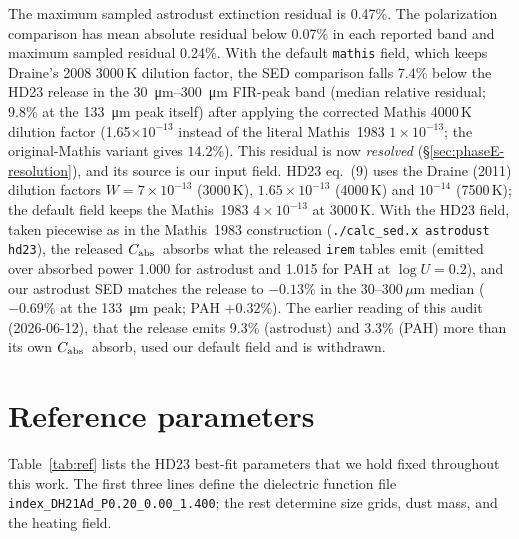 \documentclass{my_memo}
\newcommand{\Cabs}{\ensuremath{C_{\rm abs}}}
\begin{document}
The maximum sampled astrodust extinction residual is 0.47\%. The
polarization comparison has mean absolute residual below 0.07\% in
each reported band and maximum sampled residual 0.24\%. With the default
\texttt{mathis} field, which keeps Draine's 2008 3000\,K dilution
factor, the SED comparison falls $7.4\%$ below the HD23 release in the
\SIrange[range-phrase=--,range-units=single]{30}{300}{\micro\meter}
FIR-peak band (median relative residual; $9.8\%$ at the
\SI{133}{\micro\meter} peak itself) after applying the corrected
Mathis 4000\,K dilution factor (1.65$\times 10^{-13}$ instead of the
literal Mathis~1983 $1\times 10^{-13}$; the original-Mathis variant
gives $14.2\%$). This residual is now \emph{resolved}
(\S\ref{sec:phaseE-resolution}), and its source is our input field.
HD23 eq.~(9) uses the Draine (2011) dilution factors
$W = 7\times10^{-13}$ (3000\,K), $1.65\times10^{-13}$ (4000\,K) and
$10^{-14}$ (7500\,K); the default field keeps the Mathis~1983
$4\times10^{-13}$ at 3000\,K. With the HD23 field, taken piecewise as
in the Mathis~1983 construction (\texttt{./calc\_sed.x astrodust
hd23}), the released \Cabs\ absorbs what the released \texttt{irem}
tables emit (emitted over absorbed power 1.000 for astrodust and 1.015
for PAH at $\log U = 0.2$), and our astrodust SED matches the release
to $-0.13\%$ in the 30--300\,$\mu$m median ($-0.69\%$ at the
\SI{133}{\micro\meter} peak; PAH $+0.32\%$). The earlier reading of
this audit (2026-06-12), that the release emits 9.3\% (astrodust) and
3.3\% (PAH) more than its own \Cabs\ absorb, used our default field
and is withdrawn.


\section{Reference parameters}

Table~\ref{tab:ref} lists the HD23 best-fit parameters that we hold
fixed throughout this work. The first three lines define the
dielectric function file \texttt{index\_DH21Ad\_P0.20\_0.00\_1.400};
the rest determine size grids, dust mass, and the heating field.
\end{document}
